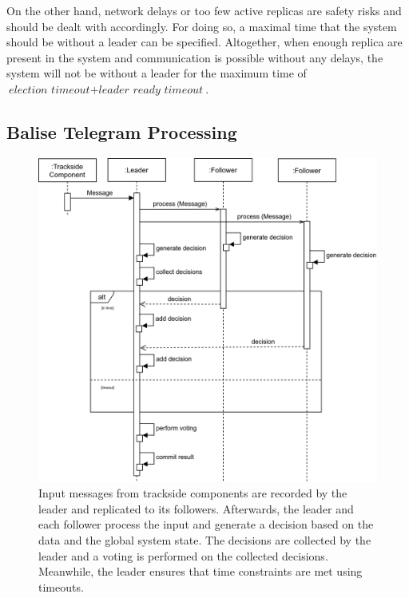 On the other hand, network delays or too few active replicas are safety risks and should be dealt with accordingly.
For doing so, a maximal time that the system should be without a leader can be specified.
Altogether, when enough replica are present in the system and communication is possible without any delays, the system will not be without a leader for the maximum time of $\textit{election timeout} + \textit{leader ready timeout}$.

\subsection{Balise Telegram Processing}
\label{subsec:ImpBaliseProcessing}
\begin{figure}[!hb]
	\centering
	\includegraphics[width=0.75\linewidth]{images/sequence/CollectResults}
	\caption{Input messages from trackside components are recorded by the leader and replicated to its followers. Afterwards, the leader and each follower process the input and generate a decision based on the data and the global system state. The decisions are collected by the leader and a voting is performed on the collected decisions. Meanwhile, the leader ensures that time constraints are met using timeouts.}
	\label{fig:SeqCollectResults}
\end{figure}


